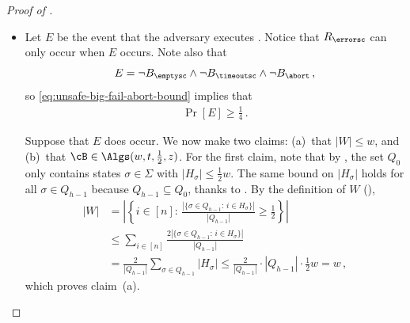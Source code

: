 \begin{itemize}
\begin{itemize}
\begin{proof}[Proof of ]
\begin{itemize}
\begin{itemize}[wide, font=\bfseries]
  \item[(Event $R_{\errorsc}$)~]
    Let $E$ be the event that the adversary executes
    . Notice that $R_{\errorsc}$ can only occur when
    $E$ occurs. Note also that
    \[
      E = \neg B_{\emptysc} \land \neg B_{\timeoutsc} \land \neg B_{\abort} \,,
    \]
    so
    \cref{eq:unsafe-big-fail-abort-bound} implies that 
    \begin{align}
      \Pr[E] \ge \frac14 \,.
      \label{eq:e-bound}
    \end{align}

    Suppose that $E$ does occur. We now make two claims: (a)~that $|W| \le w$,
    and (b)~that $\cB \in \Algs(w,t,\frac12,z)$. For the first claim, note
    that by , the set $Q_0$ only contains states $\sigma
    \in \Sigma$ with $|H_\sigma| \le \frac{1}{2} w$. The same bound on
    $|H_\sigma|$ holds for all $\sigma \in Q_{h-1}$ because $Q_{h-1} \subseteq
    Q_0$, thanks to .  By the definition of $W$
    (),
    \begin{align*}
      |W| 
      &= \left|\left\{i \in [n] :\, 
        \frac{|\{\sigma \in Q_{h-1} :\, i \in H_\sigma \}|}{|Q_{h-1}|} 
        \ge \frac{1}{2} \right\}\right| \\
      &\le \sum_{i \in [n]} \frac{2 |\{\sigma \in Q_{h-1} :\, i \in H_\sigma \}|}{|Q_{h-1}|} \\
      &= \frac{2}{|Q_{h-1}|} \sum_{\sigma \in Q_{h-1}} |H_\sigma|
      \le \frac{2}{|Q_{h-1}|} \cdot |Q_{h-1}| \cdot \frac{1}{2} w 
      = w \,,
    \end{align*}
    which proves claim~(a).
  

\end{itemize}
\end{itemize}
\end{proof}
\end{itemize}
\end{itemize}
